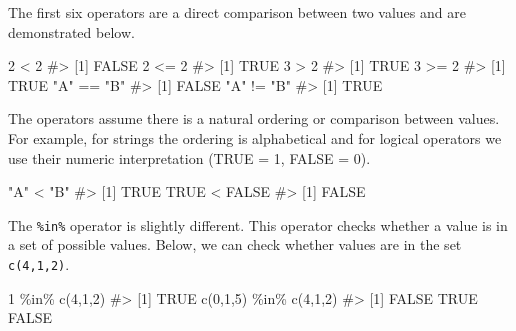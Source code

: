 \documentclass[
  letterpaper,
]{krantz}
\makeatletter
\newenvironment{Shaded}{\begin{snugshade}}{\end{snugshade}}
\newcommand{\CommentTok}[1]{\textcolor[rgb]{0.37,0.37,0.37}{#1}}
\newcommand{\ConstantTok}[1]{\textcolor[rgb]{0.56,0.35,0.01}{#1}}
\newcommand{\DecValTok}[1]{\textcolor[rgb]{0.68,0.00,0.00}{#1}}
\newcommand{\FunctionTok}[1]{\textcolor[rgb]{0.28,0.35,0.67}{#1}}
\newcommand{\NormalTok}[1]{\textcolor[rgb]{0.00,0.23,0.31}{#1}}
\newcommand{\SpecialCharTok}[1]{\textcolor[rgb]{0.37,0.37,0.37}{#1}}
\newcommand{\StringTok}[1]{\textcolor[rgb]{0.13,0.47,0.30}{#1}}
\newenvironment{kframe}{%
\medskip{}
\setlength{\fboxsep}{.8em}
 \def\at@end@of@kframe{}%
 \ifinner\ifhmode%
  \def\at@end@of@kframe{\end{minipage}}%
  \begin{minipage}{\columnwidth}%
 \fi\fi%
 \def\FrameCommand##1{\hskip\@totalleftmargin \hskip-\fboxsep
 \colorbox{shadecolor}{##1}\hskip-\fboxsep
     \hskip-\linewidth \hskip-\@totalleftmargin \hskip\columnwidth}%
 \MakeFramed {\advance\hsize-\width
   \@totalleftmargin\z@ \linewidth\hsize
   \@setminipage}}%
 {\par\unskip\endMakeFramed%
 \at@end@of@kframe}
\renewenvironment{Shaded}{\begin{kframe}}{\end{kframe}}
\makeatother
\begin{document}
The first six operators are a direct comparison between two values and
are demonstrated below.

\begin{Shaded}
\begin{Highlighting}[]
\DecValTok{2} \SpecialCharTok{\textless{}} \DecValTok{2}
\CommentTok{\#\textgreater{} [1] FALSE}
\DecValTok{2} \SpecialCharTok{\textless{}=} \DecValTok{2}
\CommentTok{\#\textgreater{} [1] TRUE}
\DecValTok{3} \SpecialCharTok{\textgreater{}} \DecValTok{2}
\CommentTok{\#\textgreater{} [1] TRUE}
\DecValTok{3} \SpecialCharTok{\textgreater{}=} \DecValTok{2}
\CommentTok{\#\textgreater{} [1] TRUE}
\StringTok{"A"} \SpecialCharTok{==} \StringTok{"B"}
\CommentTok{\#\textgreater{} [1] FALSE}
\StringTok{"A"} \SpecialCharTok{!=} \StringTok{"B"}
\CommentTok{\#\textgreater{} [1] TRUE}
\end{Highlighting}
\end{Shaded}

The operators assume there is a natural ordering or comparison between
values. For example, for strings the ordering is alphabetical and for
logical operators we use their numeric interpretation (TRUE = 1, FALSE =
0).

\begin{Shaded}
\begin{Highlighting}[]
\StringTok{"A"} \SpecialCharTok{\textless{}} \StringTok{"B"}
\CommentTok{\#\textgreater{} [1] TRUE}
\ConstantTok{TRUE} \SpecialCharTok{\textless{}} \ConstantTok{FALSE}
\CommentTok{\#\textgreater{} [1] FALSE}
\end{Highlighting}
\end{Shaded}

The \texttt{\%in\%} operator is slightly different. This operator checks
whether a value is in a set of possible values. Below, we can check
whether values are in the set \texttt{c(4,1,2)}.

\begin{Shaded}
\begin{Highlighting}[]
\DecValTok{1} \SpecialCharTok{\%in\%} \FunctionTok{c}\NormalTok{(}\DecValTok{4}\NormalTok{,}\DecValTok{1}\NormalTok{,}\DecValTok{2}\NormalTok{)}
\CommentTok{\#\textgreater{} [1] TRUE}
\FunctionTok{c}\NormalTok{(}\DecValTok{0}\NormalTok{,}\DecValTok{1}\NormalTok{,}\DecValTok{5}\NormalTok{) }\SpecialCharTok{\%in\%} \FunctionTok{c}\NormalTok{(}\DecValTok{4}\NormalTok{,}\DecValTok{1}\NormalTok{,}\DecValTok{2}\NormalTok{)}
\CommentTok{\#\textgreater{} [1] FALSE  TRUE FALSE}
\end{Highlighting}
\end{Shaded}
\end{document}
